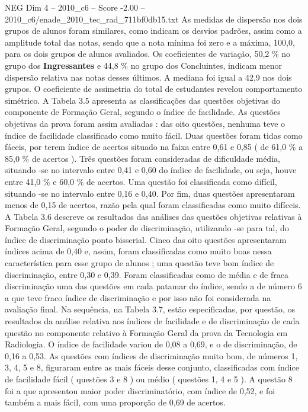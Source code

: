 \begin{textsample}{NEG Dim 4 – 2010\_c6 – Score -2.00 – 2010\_c6/enade\_2010\_tec\_rad\_711bf0db15.txt}
As medidas de dispersão nos dois grupos de alunos foram similares, como indicam os desvios padrões, assim como a amplitude total das notas, sendo que a nota mínima foi zero e a máxima, 100,0, para os dois grupos de alunos avaliados.
Os coeficientes de variação, 50,2 \% no grupo dos \textbf{Ingressantes} e 44,8 \% no grupo dos Concluintes, indicam menor dispersão relativa nas notas desses últimos.
A mediana foi igual a 42,9 nos dois grupos.
O coeficiente de assimetria do total de estudantes revelou comportamento simétrico.
A Tabela 3.5 apresenta as classificações das questões objetivas do componente de Formação Geral, segundo o índice de facilidade.
As questões objetivas da prova foram assim avaliadas : das oito questões, nenhuma teve o índice de facilidade classificado como muito fácil.
Duas questões foram tidas como fáceis, por terem índice de acertos situado na faixa entre 0,61 e 0,85 ( de 61,0 \% a 85,0 \% de acertos ).
Três questões foram consideradas de dificuldade média, situando -se no intervalo entre 0,41 e 0,60 do índice de facilidade, ou seja, houve entre 41,0 \% e 60,0 \% de acertos.
Uma questão foi classificada como difícil, situando -se no intervalo entre 0,16 e 0,40.
Por fim, duas questões apresentaram menos de 0,15 de acertos, razão pela qual foram classificadas como muito difíceis.
A Tabela 3.6 descreve os resultados das análises das questões objetivas relativas à Formação Geral, segundo o poder de discriminação, utilizando -se para tal, do índice de discriminação ponto bisserial.
Cinco das oito questões apresentaram índices acima de 0,40 e, assim, foram classificadas como muito boas nessa característica para esse grupo de alunos ; uma questão teve bom índice de discriminação, entre 0,30 e 0,39.
Foram classificadas como de média e de fraca discriminação uma das questões em cada patamar do índice, sendo a de número 6 a que teve fraco índice de discriminação e por isso não foi considerada na avaliação final.
Na sequência, na Tabela 3.7, estão especificadas, por questão, os resultados da análise relativa aos índices de facilidade e de discriminação de cada questão no componente relativo à Formação Geral da prova da Tecnologia em Radiologia.
O índice de facilidade variou de 0,08 a 0,69, e o de discriminação, de 0,16 a 0,53.
As questões com índices de discriminação muito bom, de números 1, 3, 4, 5 e 8, figuraram entre as mais fáceis desse conjunto, classificadas com índice de facilidade fácil ( questões 3 e 8 ) ou médio ( questões 1, 4 e 5 ).
A questão 8 foi a que apresentou maior poder discriminatório, com índice de 0,52, e foi também a mais fácil, com uma proporção de 0,69 de acertos.

\end{textsample}
